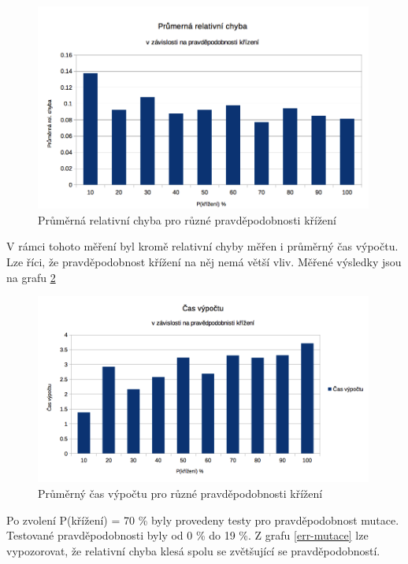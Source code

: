 \documentclass[a4paper]{article}
\begin{document}
	\begin{figure}[h]\centering
		\includegraphics[width=0.99\textwidth]{chyba-krizeni.png} 
		\caption{Průměrná relativní chyba pro různé pravděpodobnosti křížení}
		\label{err-krizeni}
	\end{figure}
	
	V rámci tohoto měření byl kromě relativní chyby měřen i průměrný čas výpočtu. Lze říci, že pravděpodobnost křížení na něj nemá větší vliv. Měřené výsledky jsou na grafu \ref{time-krizeni}
	
	\begin{figure}[h]\centering
		\includegraphics[width=0.99\textwidth]{cas-krizeni.png} 
		\caption{Průměrný čas výpočtu pro různé pravděpodobnosti křížení}
		\label{time-krizeni}
	\end{figure}
	
	Po zvolení P(křížení) = 70 \% byly provedeny testy pro pravděpodobnost mutace. Testované pravděpodobnosti byly od 0 \% do 19 \%.	 Z grafu \ref{err-mutace} lze vypozorovat, že relativní chyba klesá spolu se zvětšující se pravděpodobností. 
	
\end{document}
